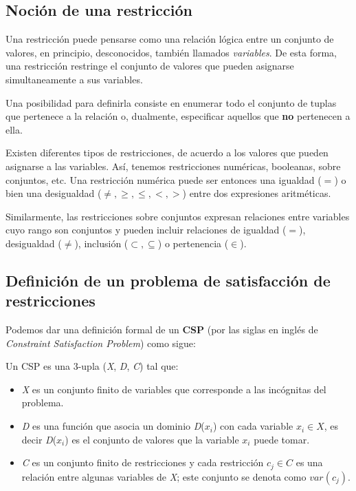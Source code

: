 \documentclass{llncs}
\begin{document}
    \subsection{Noci\'on de una restricci\'on}
      Una restricci\'on puede pensarse como una relaci\'on l\'ogica entre un conjunto de valores, en principio,
      desconocidos, tambi\'en llamados \textit{variables}. De esta forma, una restricci\'on restringe el conjunto
      de valores que pueden asignarse simultaneamente a sus variables.
      
      Una posibilidad para definirla consiste en enumerar todo el conjunto de tuplas que pertenece a la relaci\'on o,
      dualmente, especificar aquellos que \textbf{no} pertenecen a ella.
      
      Existen diferentes tipos de restricciones, de acuerdo a los valores que pueden asignarse a las variables. As\'i,
      tenemos restricciones num\'ericas, booleanas, sobre conjuntos, etc. Una restricci\'on num\'erica puede ser entonces
      una igualdad ($=$) o bien una desigualdad ($\neq, \geq, \leq, <, >$) entre dos expresiones aritm\'eticas.
      
      Similarmente, las restricciones sobre conjuntos expresan relaciones entre variables cuyo rango son conjuntos y pueden
      incluir relaciones de igualdad ($=$), desigualdad ($\neq$), inclusi\'on ($\subset, \subseteq$) o pertenencia ($\in$).
      
    \subsection{Definici\'on de un problema de satisfacci\'on de restricciones}
      Podemos dar una definici\'on formal de un \textbf{CSP} (por las siglas en ingl\'es de \textit{Constraint
      Satisfaction Problem}) como sigue:
      
      Un CSP es una 3-upla (\textit{X}, \textit{D}, \textit{C}) tal que:
      \begin{itemize}
        \item \textit{X} es un conjunto finito de variables que corresponde a las inc\'ognitas del problema.
        \item \textit{D} es una funci\'on que asocia un dominio \textit{D}($x_i$) con cada variable $x_i \in \textit{X}$, es
        decir \textit{D}($x_i$) es el conjunto de valores que la variable $x_i$ puede tomar.
        \item \textit{C} es un conjunto finito de restricciones y cada restricci\'on $c_j \in C$ es una relaci\'on entre
        algunas variables de \textit{X}; este conjunto se denota como $var(c_j).$
      \end{itemize}
      
\end{document}
